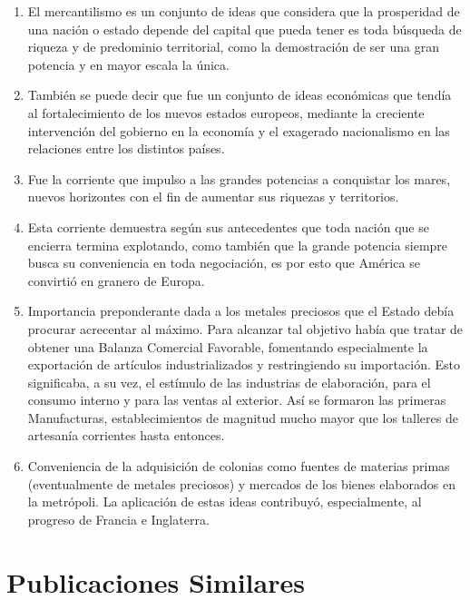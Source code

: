 \documentclass[
  jou,
  floatsintext,
  longtable,
  a4paper,
  nolmodern,
  notxfonts,
  notimes,
  colorlinks=true,linkcolor=blue,citecolor=blue,urlcolor=blue]{apa7}
\begin{document}
\begin{enumerate}
\def\labelenumi{\arabic{enumi}.}
\item
  \hspace{0pt} El mercantilismo es un conjunto de ideas que considera
  que la prosperidad de una nación o estado depende del capital que
  pueda tener es toda búsqueda de riqueza y de predominio territorial,
  como la demostración de ser una gran potencia y en mayor escala la
  única.
\item
  \hspace{0pt} También se puede decir que fue un conjunto de ideas
  económicas que tendía al fortalecimiento de los nuevos estados
  europeos, mediante la creciente intervención del gobierno en la
  economía y el exagerado nacionalismo en las relaciones entre los
  distintos países.
\item
  \hspace{0pt} Fue la corriente que impulso a las grandes potencias a
  conquistar los mares, nuevos horizontes con el fin de aumentar sus
  riquezas y territorios.
\item
  \hspace{0pt} Esta corriente demuestra según sus antecedentes que toda
  nación que se encierra termina explotando, como también que la grande
  potencia siempre busca su conveniencia en toda negociación, es por
  esto que América se convirtió en granero de Europa.
\item
  Importancia preponderante dada a los metales preciosos que el Estado
  debía procurar acrecentar al máximo. Para alcanzar tal objetivo había
  que tratar de obtener una Balanza Comercial Favorable, fomentando
  especialmente la exportación de artículos industrializados y
  restringiendo su importación. Esto significaba, a su vez, el estímulo
  de las industrias de elaboración, para el consumo interno y para las
  ventas al exterior. Así se formaron las primeras Manufacturas,
  establecimientos de magnitud mucho mayor que los talleres de artesanía
  corrientes hasta entonces.
\item
  \hspace{0pt} Conveniencia de la adquisición de colonias como fuentes
  de materias primas (eventualmente de metales preciosos) y mercados de
  los bienes elaborados en la metrópoli. La aplicación de estas ideas
  contribuyó, especialmente, al progreso de Francia e Inglaterra.
\end{enumerate}

\section{Publicaciones Similares}\label{publicaciones-similares}
\end{document}

